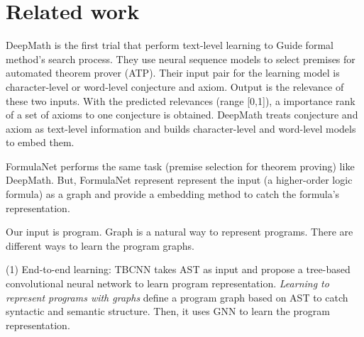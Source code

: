 \documentclass{article}
\begin{document}
%

\section{Related work}

DeepMath \cite{NIPS2016_6280} is the first trial that perform text-level learning to Guide formal method's search process. They use neural sequence models to select premises for automated theorem prover (ATP). Their input pair for the learning model is character-level or word-level conjecture and axiom. Output is the relevance of these two inputs. With the predicted relevances (range [0,1]), a importance rank of a set of axioms to one conjecture is obtained. DeepMath treats conjecture and axiom as text-level information and builds character-level and word-level models to embed them.

FormulaNet \cite{NIPS2017_6871} performs the same task (premise selection for theorem proving) like DeepMath. But, FormulaNet represent represent the input (a higher-order logic formula) as a graph and provide a embedding method to catch the formula's representation.

Our input is program.  Graph is a natural way to represent programs. There are different ways to learn the program graphs.

(1) End-to-end learning: TBCNN \cite{DBLP:journals/corr/MouLJZW14} takes AST as input and propose a tree-based convolutional neural network to learn program representation. \textit{Learning to represent programs with graphs} \cite{DBLP:journals/corr/abs-1711-00740} define a program graph based on AST to catch syntactic and semantic structure. Then, it uses GNN to learn the program representation.
\end{document}
